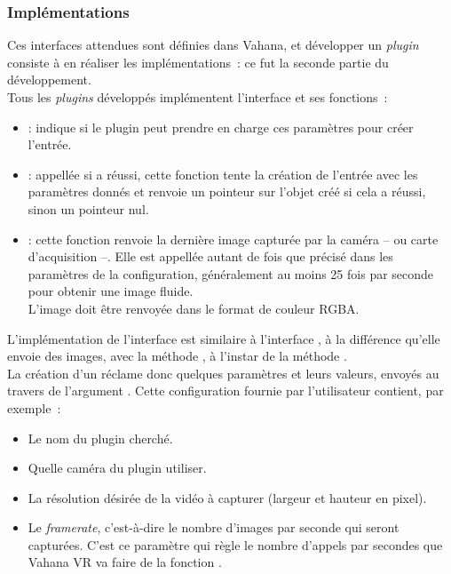 \subsubsection{Implémentations}
Ces interfaces attendues sont définies dans Vahana, et développer un \textit{plugin} consiste
à en réaliser les implémentations~: ce fut la seconde partie du développement.\\
Tous les \textit{plugins} développés implémentent l'interface 
et ses fonctions~:
\begin{itemize}
  \item {} : indique si le
  plugin peut prendre en charge ces paramètres pour créer l'entrée.
  \item {} : appellée si 
  a réussi, cette fonction tente la création de l'entrée avec les paramètres donnés
  et renvoie un pointeur sur l'objet  créé si cela a réussi, sinon
  un pointeur nul.
  \item {} : cette fonction renvoie la
  dernière image capturée par la caméra -- ou carte d'acquisition --. Elle est
  appellée autant de fois que précisé dans les paramètres de la configuration,
  généralement au moins 25 fois par seconde pour obtenir une image fluide.\\
  L'image doit être renvoyée dans le format de couleur RGBA.
\end{itemize}
L'implémentation de l'interface  est similaire à l'interface ,
à la différence qu'elle envoie des images, avec la méthode , 
à l'instar de la méthode .\\
\newline
La création d'un  réclame donc quelques paramètres et leurs valeurs, envoyés 
au travers de l'argument . Cette configuration fournie par
l'utilisateur contient, par exemple~:
\begin{itemize}
  \item Le nom du plugin cherché.
  \item Quelle caméra du plugin utiliser.
  \item La résolution désirée de la vidéo à capturer (largeur et hauteur en pixel).
  \item Le \textit{framerate}, c'est-à-dire le nombre d'images par seconde qui 
  seront capturées. C'est ce paramètre qui règle le nombre 
  d'appels par secondes que Vahana VR va faire de la fonction .
\end{itemize}
